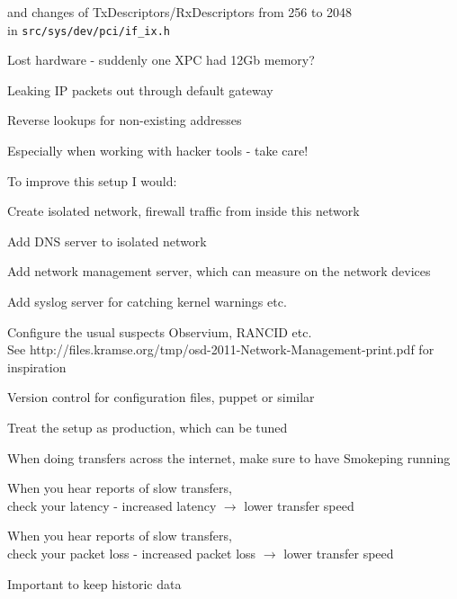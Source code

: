 \documentclass[20pt,landscape,a4paper,footrule]{foils}
\begin{document}
and changes of TxDescriptors/RxDescriptors from 256 to 2048\\
in \verb+src/sys/dev/pci/if_ix.h+


\begin{list1}
\item Lost hardware - suddenly one XPC had 12Gb memory?
\item Leaking IP packets out through default gateway
\item Reverse lookups for non-existing addresses
\item Especially when working with hacker tools - take care!
\end{list1}





\begin{list1}
\item To improve this setup I would:
\begin{list2}
\item Create isolated network, firewall traffic from inside this network
\item Add DNS server to isolated network
\item Add network management server, which can measure on the network devices
\item Add syslog server for catching kernel warnings etc.
\item Configure the usual suspects Observium, RANCID etc.\\
See http://files.kramse.org/tmp/osd-2011-Network-Management-print.pdf for inspiration
\item Version control for configuration files, puppet or similar
\end{list2}
\item Treat the setup as production, which can be tuned
\end{list1}


\begin{list1}
\item When doing transfers across the internet, make sure to have Smokeping running
\item When you hear reports of slow transfers, \\
check your latency - increased latency $\rightarrow$ lower transfer speed
\item When you hear reports of slow transfers, \\
check your packet loss - increased packet loss $\rightarrow$ lower transfer speed

\item Important to keep historic data
\end{list1}
\end{document}
